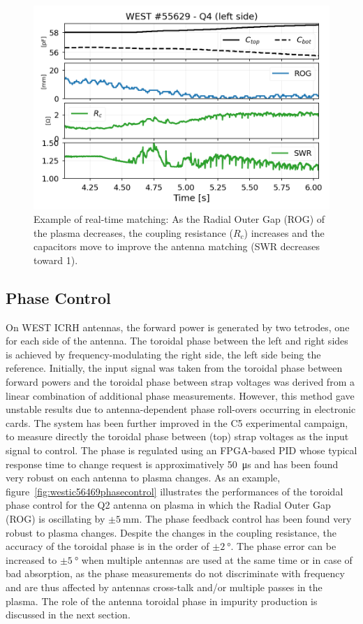 \documentclass[12p]{iopart}
\begin{document}
\begin{figure}
	\centering
	\includegraphics[width=0.95\linewidth]{figures/WEST_IC_55629_auto_matching}
	\caption{Example of real-time matching: As the Radial Outer Gap (ROG) of the plasma decreases, the coupling resistance ($R_c$) increases and the capacitors move to improve the antenna matching (SWR decreases toward 1).}
	\label{fig:westic55629automatching}
\end{figure}


\subsection{Phase Control}

On WEST ICRH antennas, the forward power is generated by two tetrodes\cite{kuus1989}, one for each side of the antenna. The toroidal phase between the left and right sides is achieved by frequency-modulating the right side, the left side being the reference. Initially, the input signal was taken from the toroidal phase between forward powers and the toroidal phase between strap voltages was derived from a linear combination of additional phase measurements. However, this method gave unstable results due to antenna-dependent phase roll-overs occurring in electronic cards. The system has been further improved in the C5 experimental campaign, to measure directly the toroidal phase between (top) strap voltages as the input signal to control. The phase is regulated using an FPGA-based PID whose typical response time to change request is approximatively \SI{50}{\micro\second} and has been found very robust on each antenna to plasma changes. As an example, figure~\ref{fig:westic56469phasecontrol} illustrates the performances of the toroidal phase control for the Q2 antenna on plasma in which the Radial Outer Gap (ROG) is oscillating by $\pm\SI{5}{\milli\meter}$. The phase feedback control has been found very robust to plasma changes. Despite the changes in the coupling resistance, the accuracy of the toroidal phase is in the order of $\pm\SI{2}{\degree}$. The phase error can be increased to $\pm\SI{5}{\degree}$ when multiple antennas are used at the same time or in case of bad absorption, as the phase measurements do not discriminate with frequency and are thus affected by antennas cross-talk and/or multiple passes in the plasma. The role of the antenna toroidal phase in impurity production is discussed in the next section. 
\end{document}
